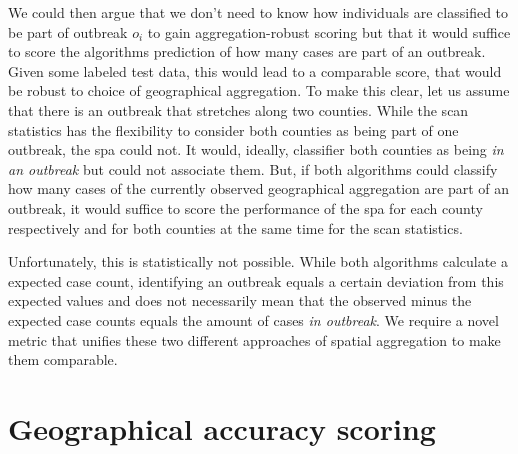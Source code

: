 \documentclass[a4paper, 12pt, one column]{article}
\begin{document}
We could then argue that we don't need to know how individuals are classified to be part of outbreak \(o_i\) to gain aggregation-robust scoring but that it would suffice to score the algorithms prediction of how many cases are part of an outbreak. Given some labeled test data, this would lead to a comparable score, that would be robust to choice of geographical aggregation. To make this clear, let us assume that there is an outbreak that stretches along two counties. While the scan statistics has the flexibility to consider both counties as being part of one outbreak, the \ac{spa} could not. It would, ideally, classifier both counties as being \emph{in an outbreak} but could not associate them. But, if both algorithms could classify how many cases of the currently observed geographical aggregation are part of an outbreak, it would suffice to score the performance of the \ac{spa} for each county respectively and for both counties at the same time for the scan statistics.

Unfortunately, this is statistically not possible. While both algorithms calculate a expected case count, identifying an outbreak equals a certain deviation from this expected values and does not necessarily mean that the observed minus the expected case counts equals the amount of cases \emph{in outbreak}. We require a novel metric that unifies these two different approaches of spatial aggregation to make them comparable.

\section{Geographical accuracy scoring}

\end{document}
